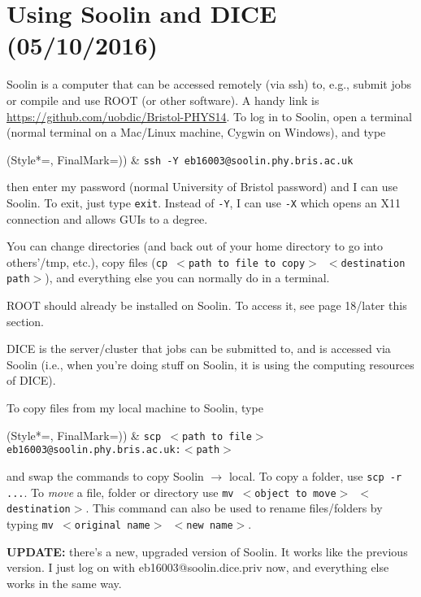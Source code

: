 \newpage
\chapter{Using Soolin and DICE (05/10/2016)}
\label{sec:usingsoolindice}

Soolin is a computer that can be accessed remotely (via ssh) to, e.g., submit jobs or compile and use ROOT (or other software). A handy link is \url{https://github.com/uobdic/Bristol-PHYS14}. To log in to Soolin, open a terminal (normal terminal on a Mac/Linux machine, Cygwin on Windows), and type

\begin{easylist}
\ListProperties(Style*=, FinalMark={)})
& \texttt{ssh -Y eb16003{@}soolin.phy.bris.ac.uk}
\end{easylist}

then enter my password (normal University of Bristol password) and I can use Soolin. To exit, just type \texttt{exit}. Instead of \texttt{-Y}, I can use \texttt{-X} which opens an X11 connection and allows GUIs to a degree.

You can change directories (and back out of your home directory to go into others'/tmp, etc.), copy files (\texttt{cp $<$path to file to copy$>$ $<$destination path$>$}), and everything else you can normally do in a terminal.

ROOT should already be installed on Soolin. To access it, see page 18/later this section.

DICE is the server/cluster that jobs can be submitted to, and is accessed via Soolin (i.e., when you're doing stuff on Soolin, it is using the computing resources of DICE).

To copy files from my local machine to Soolin, type

\begin{easylist}
\ListProperties(Style*=, FinalMark={)})
& \texttt{scp $<$path to file$>$ eb16003@soolin.phy.bris.ac.uk:$<$path$>$}
\end{easylist}

and swap the commands to copy Soolin $\rightarrow$ local. To copy a folder, use \texttt{scp -r ...}. To \emph{move} a file, folder or directory use \texttt{mv $<$object to move$>$ $<$destination$>$}. This command can also be used to rename files/folders by typing \texttt{mv $<$original name$>$ $<$new name$>$}.

\textbf{UPDATE:} there's a new, upgraded version of Soolin. It works like the previous version. I just log on with eb16003@soolin.dice.priv now, and everything else works in the same way.

